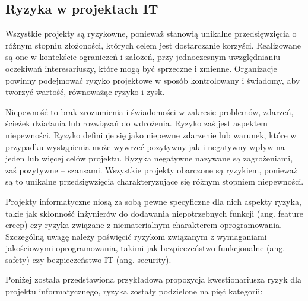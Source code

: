 \subsection{Ryzyka w projektach IT}
Wszystkie projekty są ryzykowne, ponieważ stanowią unikalne przedsięwzięcia o różnym stopniu złożoności, których celem jest dostarczanie korzyści. Realizowane są one w kontekście ograniczeń i założeń, przy jednoczesnym uwzględnianiu oczekiwań interesariuszy, które mogą być sprzeczne i zmienne. Organizacje powinny podejmować ryzyko projektowe w sposób kontrolowany i świadomy, aby tworzyć wartość, równoważąc ryzyko i zysk. \autocite{pmbok6} 

Niepewność to brak zrozumienia i świadomości w zakresie problemów, zdarzeń, ścieżek działania lub rozwiązań do wdrożenia. Ryzyko zaś jest aspektem niepewności. Ryzyko definiuje się jako niepewne zdarzenie lub warunek, które w przypadku wystąpienia może wywrzeć pozytywny jak i negatywny wpływ na jeden lub więcej celów projektu. Ryzyka negatywne nazywane są zagrożeniami, zaś pozytywne – szansami. Wszystkie projekty obarczone są ryzykiem, ponieważ są to unikalne przedsięwzięcia charakteryzujące się różnym stopniem niepewności.\autocite{pmbok7}

Projekty informatyczne niosą za sobą pewne specyficzne dla nich aspekty ryzyka, takie jak skłonność inżynierów do dodawania niepotrzebnych funkcji (ang. feature creep) czy ryzyka związane z niematerialnym charakterem oprogramowania. Szczególną uwagę należy poświęcić ryzykom związanym z wymaganiami jakościowymi oprogramowania, takimi jak bezpieczeństwo funkcjonalne (ang. safety) czy bezpieczeństwo IT (ang. security)\autocite{program}.\autocite{swebok}

Poniżej została przedstawiona przykładowa propozycja kwestionariusza ryzyk dla projektu informatycznego, ryzyka zostały podzielone na pięć kategorii: \autocite{ITPM}

